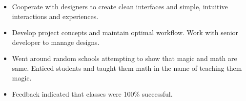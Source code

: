 


    \begin{itemize}
        \item Cooperate with designers to create clean interfaces and simple, intuitive interactions and experiences.
        \item Develop project concepts and maintain optimal workflow. Work with senior developer to manage designs.
    \end{itemize}
    
\divider

    \begin{itemize}
        \item Went around random schools attempting to show that magic and math are same. Enticed students and taught them math in the name of teaching them magic.
        \item Feedback indicated that classes were 100\% successful.
\end{itemize}
